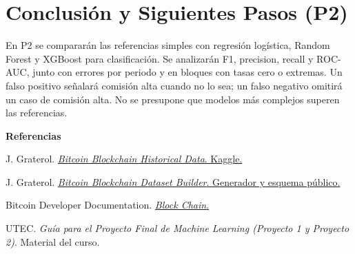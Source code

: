 \documentclass[11pt,a4paper]{article}
\begin{document}
\section{Conclusión y Siguientes Pasos (P2)}

En P2 se compararán las referencias simples con regresión logística, Random Forest y XGBoost para clasificación. Se analizarán F1, precision, recall y ROC-AUC, junto con errores por periodo y en bloques con tasas cero o extremas. Un falso positivo señalará comisión alta cuando no lo sea; un falso negativo omitirá un caso de comisión alta. No se presupone que modelos más complejos superen las referencias.

{\footnotesize\setlength{\parskip}{1pt}
{}
\textbf{Referencias}\par
[1] J. Graterol. \href{https://www.kaggle.com/datasets/jesusgraterol/bitcoin-blockchain-dataset}{\textit{Bitcoin Blockchain Historical Data}. Kaggle.}\par
[2] J. Graterol. \href{https://github.com/jesusgraterol/bitcoin-blockchain-dataset-builder}{\textit{Bitcoin Blockchain Dataset Builder}. Generador y esquema público.}\par
[3] Bitcoin Developer Documentation. \href{https://developer.bitcoin.org/reference/block_chain.html}{\textit{Block Chain}.}\par
[4] UTEC. \textit{Guía para el Proyecto Final de Machine Learning (Proyecto 1 y Proyecto 2)}. Material del curso.
}
\end{document}
